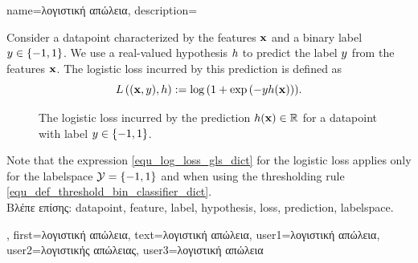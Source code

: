 {name={\foreignlanguage{greek}{λογιστική απώλεια}}, 
	description={Consider 
		a \gls{datapoint} characterized by the \gls{feature}s ${\bf x}$ and a binary \gls{label} $y \in \{-1,1\}$. 
		We use a real-valued \gls{hypothesis} $h$ to predict the \gls{label} $y$ 
		from the \gls{feature}s ${\bf x}$. The logistic \gls{loss} incurred by this \gls{prediction} is 
		defined as 
		\begin{equation} 
		\label{equ_log_loss_gls_dict}
		L\left(({\bf x},y),h \right) :=  \log\, ( 1 + \exp\,(- y h({\bf x}))).
		\end{equation}
		\begin{figure}[H]
		\begin{center}
		\caption{The logistic \gls{loss} incurred by the \gls{prediction} $h({\bf x}) \in \mathbb{R}$ 
			for a \gls{datapoint} with \gls{label} $y \in \{-1,1\}$.}
		\label{fig_logloss_dict}
		\end{center}
		\end{figure}
		Note that the expression \eqref{equ_log_loss_gls_dict} for the logistic \gls{loss} applies only for the \gls{labelspace} 
		$\mathcal{Y} = \{ -1,1\}$ and when using the thresholding rule \eqref{equ_def_threshold_bin_classifier_dict}.\\
		\foreignlanguage{greek}{Βλέπε επίσης:} \gls{datapoint}, \gls{feature}, \gls{label}, \gls{hypothesis}, \gls{loss}, \gls{prediction}, \gls{labelspace}.},
	first={\foreignlanguage{greek}{λογιστική απώλεια}},
	text={\foreignlanguage{greek}{λογιστική απώλεια}},
	user1={\foreignlanguage{greek}{λογιστική απώλεια}}, %
	user2={\foreignlanguage{greek}{λογιστικής απώλειας}}, %
	user3={\foreignlanguage{greek}{λογιστική απώλεια}} %
}

